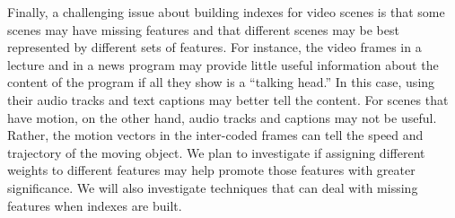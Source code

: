 Finally, a challenging issue about building indexes for video scenes
is that some scenes may have missing features and that different
scenes may be best represented by different sets of
features.  For instance, the video frames in a lecture and in a news program
may provide little useful information about the content
of the program if all they show is a ``talking head.''
In this case, using their audio tracks
and text captions may better tell the content. For scenes that
have motion, on the other hand, audio tracks and captions may not be useful.
Rather, the motion vectors in the inter-coded frames
can tell the speed and trajectory
of the moving object. We plan to investigate if
assigning different weights to different features may 
help promote those features with greater significance.
We will also investigate techniques that can deal
with missing features when indexes are built.


